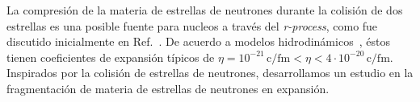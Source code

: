 La compresión de la materia de estrellas de neutrones durante la colisión de dos estrellas es una posible fuente para nucleos a través del \emph{r-process}, como fue discutido inicialmente en Ref.~\cite{lattimer_black-hole-neutron-star_1974}.
De acuerdo a modelos hidrodinámicos~\cite{goriely_r-process_2011}, éstos tienen coeficientes de expansión típicos de  $\eta = 10^{-21}\,\text{c/fm} < \eta < 4\cdot 10^{-20}\,\text{c/fm}$.
Inspirados por la colisión de estrellas de neutrones, desarrollamos un estudio en la fragmentación de materia de estrellas de neutrones en expansión.



